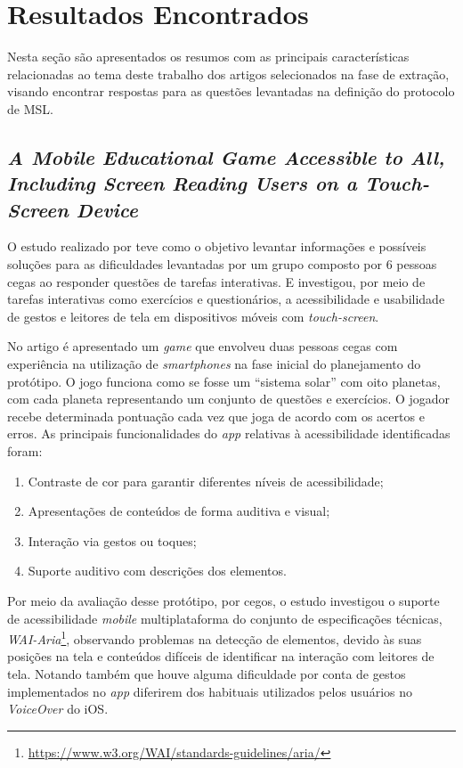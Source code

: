 \newpage{}

\section{Resultados Encontrados}

Nesta seção são apresentados os resumos com as principais características relacionadas ao tema deste trabalho dos artigos selecionados na fase de extração, visando encontrar respostas para as questões levantadas na definição do protocolo de MSL\@.

\subsection{\emph{A Mobile Educational Game Accessible to All, Including Screen Reading Users on a Touch-Screen Device}}

O estudo realizado por  teve como o objetivo levantar informações e possíveis soluções para as dificuldades levantadas por um grupo composto por 6 pessoas cegas ao responder questões de tarefas interativas.
E investigou, por meio de tarefas interativas como exercícios e questionários, a acessibilidade e usabilidade de gestos e leitores de tela em dispositivos móveis com \emph{touch-screen}.

No artigo é apresentado um \emph{game} que envolveu duas pessoas cegas com experiência na utilização de \emph{smartphones} na fase inicial do planejamento do protótipo.
O jogo funciona como se fosse um ``sistema solar'' com oito planetas, com cada planeta representando um conjunto de questões e exercícios.
O jogador recebe determinada pontuação cada vez que joga de acordo com os acertos e erros.
As principais funcionalidades do \emph{app} relativas à acessibilidade identificadas foram:

\begin{enumerate}
    \item Contraste de cor para garantir diferentes níveis de acessibilidade;
    \item Apresentações de conteúdos de forma auditiva e visual;
    \item Interação via gestos ou toques;
    \item Suporte auditivo com descrições dos elementos.
\end{enumerate}

Por meio da avaliação desse protótipo, por cegos, o estudo investigou o suporte de acessibilidade \emph{mobile} multiplataforma do conjunto de especificações
técnicas, \emph{WAI-Aria}\footnote{\url{https://www.w3.org/WAI/standards-guidelines/aria/}}, observando problemas na detecção de elementos, devido às suas posições
na tela e conteúdos difíceis de identificar na interação com leitores de tela.
Notando também que houve alguma dificuldade por conta de gestos implementados no \emph{app} diferirem dos habituais utilizados pelos usuários no \emph{VoiceOver} do iOS.

